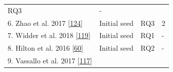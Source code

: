 \documentclass[]{book}
\begin{document}
\begin{longtable}[]{@{}llll@{}}
\begin{minipage}[t]{0.14\columnwidth}
RQ3\strut
\end{minipage} & \begin{minipage}[t]{0.06\columnwidth}\raggedright\strut
-\strut
\end{minipage}\tabularnewline
\begin{minipage}[t]{0.48\columnwidth}\raggedright\strut
6. Zhao et al. 2017
{[}\protect\hyperlink{ref-zhao2017impact}{124}{]}\strut
\end{minipage} & \begin{minipage}[t]{0.20\columnwidth}\raggedright\strut
Initial seed\strut
\end{minipage} & \begin{minipage}[t]{0.14\columnwidth}\raggedright\strut
RQ3\strut
\end{minipage} & \begin{minipage}[t]{0.06\columnwidth}\raggedright\strut
2\strut
\end{minipage}\tabularnewline
\begin{minipage}[t]{0.48\columnwidth}\raggedright\strut
7. Widder et al. 2018
{[}\protect\hyperlink{ref-widder2018m}{119}{]}\strut
\end{minipage} & \begin{minipage}[t]{0.20\columnwidth}\raggedright\strut
Initial seed\strut
\end{minipage} & \begin{minipage}[t]{0.14\columnwidth}\raggedright\strut
RQ1\strut
\end{minipage} & \begin{minipage}[t]{0.06\columnwidth}\raggedright\strut
-\strut
\end{minipage}\tabularnewline
\begin{minipage}[t]{0.48\columnwidth}\raggedright\strut
8. Hilton et al. 2016
{[}\protect\hyperlink{ref-hilton2016usage}{60}{]}\strut
\end{minipage} & \begin{minipage}[t]{0.20\columnwidth}\raggedright\strut
Initial seed\strut
\end{minipage} & \begin{minipage}[t]{0.14\columnwidth}\raggedright\strut
RQ2\strut
\end{minipage} & \begin{minipage}[t]{0.06\columnwidth}\raggedright\strut
-\strut
\end{minipage}\tabularnewline
\begin{minipage}[t]{0.48\columnwidth}\raggedright\strut
9. Vassallo et al. 2017
{[}\protect\hyperlink{ref-vassallo2017tale}{117}{]}\strut

\end{minipage}
\end{longtable}
\end{document}
